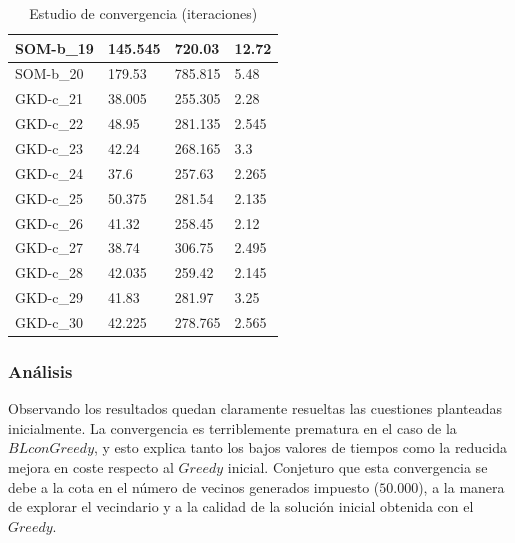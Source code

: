 \documentclass[11pt,a4paper]{article}
\begin{document}
\begin{table}[H]
\begin{tabular}{l|l|l|l|}
			\multicolumn{1}{|l|}{SOM-b\_19} & 145.545        & 720.03          & 12.72         \\ \hline
			\multicolumn{1}{|l|}{SOM-b\_20} & 179.53         & 785.815         & 5.48          \\ \hline
			\multicolumn{1}{|l|}{GKD-c\_21} & 38.005         & 255.305         & 2.28          \\ \hline
			\multicolumn{1}{|l|}{GKD-c\_22} & 48.95          & 281.135         & 2.545         \\ \hline
			\multicolumn{1}{|l|}{GKD-c\_23} & 42.24          & 268.165         & 3.3           \\ \hline
			\multicolumn{1}{|l|}{GKD-c\_24} & 37.6           & 257.63          & 2.265         \\ \hline
			\multicolumn{1}{|l|}{GKD-c\_25} & 50.375         & 281.54          & 2.135         \\ \hline
			\multicolumn{1}{|l|}{GKD-c\_26} & 41.32          & 258.45          & 2.12          \\ \hline
			\multicolumn{1}{|l|}{GKD-c\_27} & 38.74          & 306.75          & 2.495         \\ \hline
			\multicolumn{1}{|l|}{GKD-c\_28} & 42.035         & 259.42          & 2.145         \\ \hline
			\multicolumn{1}{|l|}{GKD-c\_29} & 41.83          & 281.97          & 3.25          \\ \hline
			\multicolumn{1}{|l|}{GKD-c\_30} & 42.225         & 278.765         & 2.565         \\ \hline
		\end{tabular}
		\caption{ Estudio de convergencia (iteraciones) }
		\label{iteraciones}	
	\end{table}
	
	\subsubsection{ Análisis }
	
	Observando los resultados quedan claramente resueltas las cuestiones planteadas inicialmente. La convergencia es terriblemente prematura en el caso de la $BL con Greedy$, y esto explica tanto los bajos valores de tiempos como la reducida mejora en coste respecto al $Greedy$ inicial. Conjeturo que esta convergencia se debe a la cota en el número de vecinos generados impuesto ($50.000$), a la manera de explorar el vecindario y a la calidad de la solución inicial obtenida con el $Greedy$. \\
	
\end{document}
